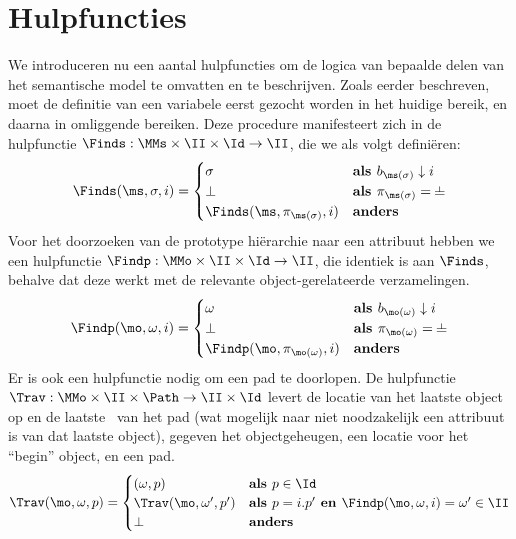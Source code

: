 \section{Hulpfuncties}
\label{sec:hulpfuncties}

We introduceren nu een aantal hulpfuncties om de logica van bepaalde delen van het semantische model te omvatten en te beschrijven.
Zoals eerder beschreven, moet de definitie van een variabele eerst gezocht worden in het huidige bereik, en daarna in omliggende bereiken. Deze procedure manifesteert zich in de hulpfunctie $\Finds : \MMs \times \II \times \Id \to \II$, die we als volgt definiëren:
%
\begin{equation*}
  \Finds(\ms, \sigma, i) = \begin{cases}
    \sigma & \textbf{als } b_{\ms(\sigma)} \downarrow i \\
    \bot & \textbf{als } \pi_{\ms(\sigma)} = \nil \\
    \Finds(\ms, \pi_{\ms(\sigma)}, i) & \textbf{anders}
  \end{cases}
\end{equation*}
%
Voor het doorzoeken van de prototype hiërarchie naar een attribuut hebben we een hulpfunctie $\Findp : \MMo \times \II \times \Id \to \II$, die identiek is aan $\Finds$, behalve dat deze werkt met de relevante object-gerelateerde verzamelingen.
%
\begin{equation*}
  \Findp(\mo, \omega, i) = \begin{cases}
    \omega & \textbf{als } b_{\mo(\omega)} \downarrow i \\
    \bot & \textbf{als } \pi_{\mo(\omega)} = \nil \\
    \Findp(\mo, \pi_{\mo(\omega)}, i) & \textbf{anders}
  \end{cases}
\end{equation*}
%
Er is ook een hulpfunctie nodig om een pad te doorlopen. De hulpfunctie $\Trav : \MMo \times \II \times \Path \to \II \times \Id$ levert de locatie van het laatste object op en de laatste \Id\ van het pad (wat mogelijk naar niet noodzakelijk een attribuut is van dat laatste object), gegeven het objectgeheugen, een locatie voor het “begin” object, en een pad.
%
\begin{equation*}
  \Trav(\mo, \omega, p) = \begin{cases}
    (\omega, p) & \textbf{als } p \in \Id \\
    \Trav(\mo, \omega', p') & \textbf{als } p = i.p' \textbf{ en } \Findp(\mo, \omega, i) = \omega' \in \II \\%
    \bot & \textbf{anders}
  \end{cases}
\end{equation*}
%

